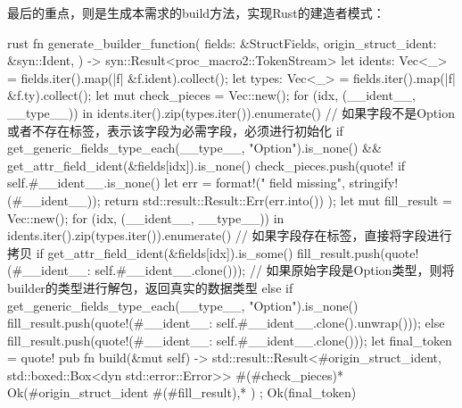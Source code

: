 最后的重点，则是生成本需求的build方法，实现Rust的建造者模式：
\begin{code-block}{rust}
fn generate_builder_function(
    fields: &StructFields,
    origin_struct_ident: &syn::Ident,
) -> syn::Result<proc_macro2::TokenStream> {
    let idents: Vec<_> = fields.iter().map(|f| &f.ident).collect();
    let types: Vec<_> = fields.iter().map(|f| &f.ty).collect();
    let mut check_pieces = Vec::new();
    for (idx, (__ident__, __type__)) in idents.iter().zip(types.iter()).enumerate() {
        // 如果字段不是Option或者不存在标签，表示该字段为必需字段，必须进行初始化
        if get_generic_fields_type_each(__type__, "Option").is_none()
            && get_attr_field_ident(&fields[idx]).is_none()
        {
            check_pieces.push(quote! {
                if self.#__ident__.is_none() {
                    let err = format!("{} field missing", stringify!(#__ident__));
                    return std::result::Result::Err(err.into())
                }
            });
        }
    }
    let mut fill_result = Vec::new();
    for (idx, (__ident__, __type__)) in idents.iter().zip(types.iter()).enumerate() {
        // 如果字段存在标签，直接将字段进行拷贝
        if get_attr_field_ident(&fields[idx]).is_some() {
            fill_result.push(quote!(#__ident__: self.#__ident__.clone()));
        // 如果原始字段是Option类型，则将builder的类型进行解包，返回真实的数据类型
        } else if get_generic_fields_type_each(__type__, "Option").is_none() {
            fill_result.push(quote!(#__ident__: self.#__ident__.clone().unwrap()));
        } else {
            fill_result.push(quote!(#__ident__: self.#__ident__.clone()));
        }
    }
    let final_token = quote! {
        pub fn build(&mut self) -> std::result::Result<#origin_struct_ident, std::boxed::Box<dyn std::error::Error>>{
            #(#check_pieces)*
            Ok(#origin_struct_ident {
                #(#fill_result),*
            })
        }
    };
    Ok(final_token)
}
\end{code-block}

